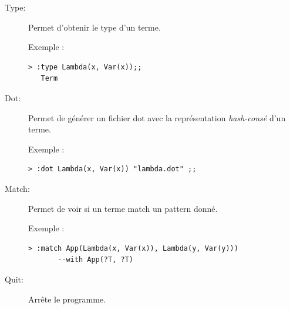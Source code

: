 \documentclass[12pt,a4paper]{article}
\begin{document}
\begin{description}
\item[Type:]
Permet d'obtenir le type d'un terme.\\

\begin{minipage}{\textwidth}
Exemple :
\begin{lstlisting}[basicstyle=\ttfamily\footnotesize]
> :type Lambda(x, Var(x));;
   Term
\end{lstlisting}
\end{minipage}

\item[Dot:]
Permet de générer un fichier dot avec la représentation \textit{hash-consé} d'un terme. \\

\begin{minipage}{\textwidth}
Exemple :
\begin{lstlisting}[basicstyle=\ttfamily\footnotesize]
> :dot Lambda(x, Var(x)) "lambda.dot" ;;
\end{lstlisting}
\end{minipage}

\item[Match:]
Permet de voir si un terme match un pattern donné. \\

\begin{minipage}{\textwidth}
Exemple :
\begin{lstlisting}[basicstyle=\ttfamily\footnotesize]
> :match App(Lambda(x, Var(x)), Lambda(y, Var(y))) 
       --with App(?T, ?T)
\end{lstlisting}
\end{minipage}

\item[Quit:]
Arrête le programme.

\end{description}
\end{document}
